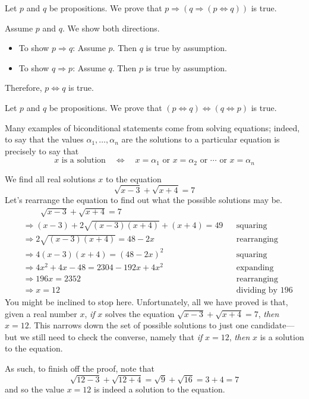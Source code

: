 \begin{example}
Let $p$ and $q$ be propositions. We prove that $p \Rightarrow (q \Rightarrow (p \Leftrightarrow q))$ is true.

Assume $p$ and $q$. We show both directions.
\begin{itemize}
  \item To show $p \Rightarrow q$: Assume $p$. Then $q$ is true by assumption.
  \item To show $q \Rightarrow p$: Assume $q$. Then $p$ is true by assumption.
\end{itemize}
Therefore, $p \Leftrightarrow q$ is true.
\end{example}

\begin{exercise}
Let $p$ and $q$ be propositions. We prove that $(p \Leftrightarrow q) \Leftrightarrow (q \Leftrightarrow p)$ is true.

\end{exercise}

Many examples of biconditional statements come from solving equations; indeed, to say that the values $\alpha_1,\dots,\alpha_n$ are the solutions to a particular equation is precisely to say that
\[
x \text{ is a solution} \quad \Leftrightarrow \quad x = \alpha_1 \text{ or } x = \alpha_2 \text{ or } \cdots \text{ or } x = \alpha_n
\]

\begin{example}
\label{exSolveSqrtFirstExample}
We find all real solutions $x$ to the equation
\[
\sqrt{x-3} + \sqrt{x+4} = 7
\]
Let's rearrange the equation to find out what the possible solutions may be.
\begin{align*}
&\phantom{\Rightarrow\;\;} \sqrt{x-3} + \sqrt{x+4} = 7 && \\
&\Rightarrow (x-3) + 2\sqrt{(x-3)(x+4)} + (x+4) = 49 && \text{squaring} \\
&\Rightarrow 2\sqrt{(x-3)(x+4)} = 48-2x && \text{rearranging} \\
&\Rightarrow 4(x-3)(x+4) = (48-2x)^2 && \text{squaring} \\
&\Rightarrow 4x^2+4x-48 = 2304-192x+4x^2 && \text{expanding} \\
&\Rightarrow 196x = 2352 && \text{rearranging} \\
&\Rightarrow x=12 && \text{dividing by $196$}
\end{align*}
You might be inclined to stop here. Unfortunately, all we have proved is that, given a real number $x$, \textit{if} $x$ solves the equation $\sqrt{x-3} + \sqrt{x+4} = 7$, \textit{then} $x=12$. This narrows down the set of possible solutions to just one candidate---but we still need to check the converse, namely that \textit{if} $x=12$, \textit{then} $x$ is a solution to the equation.

As such, to finish off the proof, note that
\[
\sqrt{12-3} + \sqrt{12+4} = \sqrt{9} + \sqrt{16} = 3 + 4 = 7
\]
and so the value $x=12$ is indeed a solution to the equation.
\end{example}

